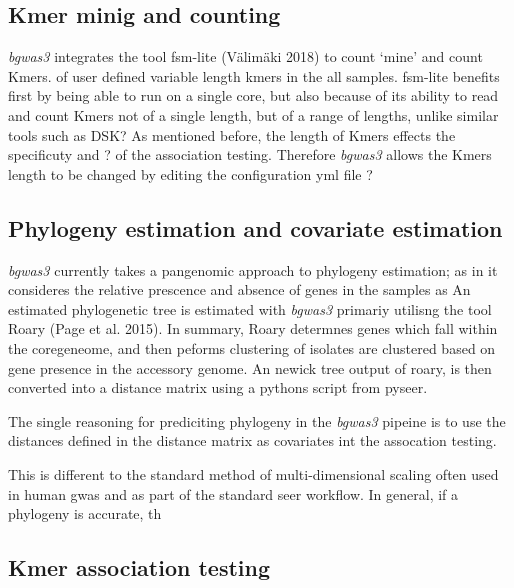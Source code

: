 \documentclass[]{DissertateUSU}
\begin{document}
\hypertarget{kmer-minig-and-counting}{%
\subsection{Kmer minig and counting}\label{kmer-minig-and-counting}}

\emph{bgwas3} integrates the tool fsm-lite (Välimäki 2018) to count
`mine' and count Kmers. of user defined variable length kmers in the all
samples. fsm-lite benefits first by being able to run on a single core,
but also because of its ability to read and count Kmers not of a single
length, but of a range of lengths, unlike similar tools such as DSK? As
mentioned before, the length of Kmers effects the specificuty and ? of
the association testing. Therefore \emph{bgwas3} allows the Kmers length
to be changed by editing the configuration yml file ?

\hypertarget{phylogeny-estimation-and-covariate-estimation}{%
\subsection{Phylogeny estimation and covariate
estimation}\label{phylogeny-estimation-and-covariate-estimation}}

\emph{bgwas3} currently takes a pangenomic approach to phylogeny
estimation; as in it consideres the relative prescence and absence of
genes in the samples as An estimated phylogenetic tree is estimated with
\emph{bgwas3} primariy utilisng the tool Roary (Page et al. 2015). In
summary, Roary determnes genes which fall within the coregeneome, and
then peforms clustering of isolates are clustered based on gene presence
in the accessory genome. An newick tree output of roary, is then
converted into a distance matrix using a pythons script from pyseer.

The single reasoning for prediciting phylogeny in the \emph{bgwas3}
pipeine is to use the distances defined in the distance matrix as
covariates int the assocation testing.

This is different to the standard method of multi-dimensional scaling
often used in human gwas and as part of the standard seer workflow. In
general, if a phylogeny is accurate, th

\hypertarget{kmer-association-testing}{%
\subsection{Kmer association testing}\label{kmer-association-testing}}
\end{document}
